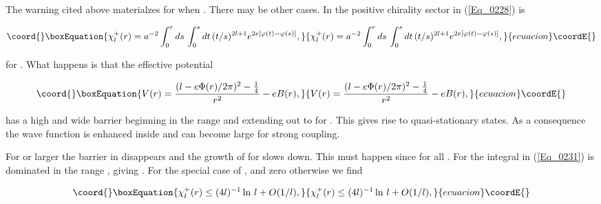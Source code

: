 \documentclass[a4paper,twocolumn,showpacs,preprintnumbers,amsmath,amssymb]{revtex4}
\begin{document}
The warning cited above materialzes for \coordHE{}
when \coordHE{}. There may be other cases. In the positive chirality
sector \coordHE{} in (\ref{Eq_0228}) is

\begin{equation}\coord{}\boxEquation{
\label{Eq_0231}
\chi^{+}_l(r) = a^{-2} \int^r_0 ds \, \int^s_0 dt \,
  (t/s)^{2l + 1} e^{2e[\varphi(t) - \varphi(s)]},
}{
\chi^{+}_l(r) = a^{-2} \int^r_0 ds \, \int^s_0 dt \,
  (t/s)^{2l + 1} e^{2e[\varphi(t) - \varphi(s)]},
}{ecuacion}\coordE{}\end{equation}

\noindent
for \coordHE{}. What happens is that the effective potential

\begin{equation}\coord{}\boxEquation{
\label{Eq_0232}
V(r) = \frac{(l - e\Phi(r)/2\pi)^2 - \frac{1}{4}}{r^2} - eB(r),
}{
V(r) = \frac{(l - e\Phi(r)/2\pi)^2 - \frac{1}{4}}{r^2} - eB(r),
}{ecuacion}\coordE{}\end{equation}

\noindent
has a high and wide barrier beginning in the range \coordHE{} and
extending out to \coordHE{} for \coordHE{}. This gives rise to
quasi-stationary states. As a consequence the wave function is
enhanced inside \coordHE{} and \coordHE{} can become large for strong
coupling.

For \coordHE{} or larger the barrier in \coordHE{} disappears and the
growth of \coordHE{} for \coordHE{} slows down. This must
happen since \coordHE{} for all \coordHE{}. For \coordHE{} the
integral in (\ref{Eq_0231}) is dominated in the range \coordHE{}, giving
\coordHE{}. For the special case of \coordHE{}, \coordHE{} and
zero otherwise we find

\begin{equation}\coord{}\boxEquation{
\label{Eq_0233}
\chi^{+}_l(r) \leq (4l)^{-1} \ln \, l + O(1/l),
}{
\chi^{+}_l(r) \leq (4l)^{-1} \ln \, l + O(1/l),
}{ecuacion}\coordE{}\end{equation}
\end{document}
